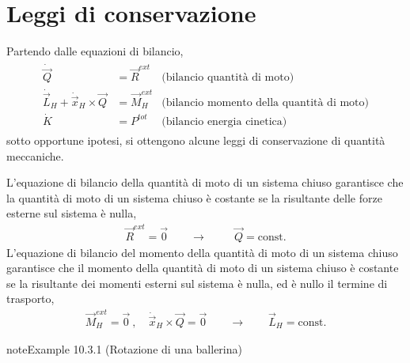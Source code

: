 \documentclass[letterpaper,10pt,italian]{jupyterBook}
\begin{document}
\section{Leggi di conservazione}
\label{\detokenize{ch/mechanics/dynamics-conservation:leggi-di-conservazione}}\label{\detokenize{ch/mechanics/dynamics-conservation:physics-hs-mechanics-dynamics-conservation}}\label{\detokenize{ch/mechanics/dynamics-conservation::doc}}
\sphinxAtStartPar
Partendo dalle equazioni di bilancio,
\begin{equation*}
\begin{split}\begin{aligned}
 \dot{\vec{Q}} & = \vec{R}^{ext} & \text{(bilancio quantità di moto)} \\
 \dot{\vec{L}}_H + \dot{\vec{x}}_H \times \vec{Q} & = \vec{M}_H^{ext} & \text{(bilancio momento della quantità di moto)} \\
 \dot{K} & = P^{tot} & \text{(bilancio energia cinetica)}
\end{aligned}\end{split}
\end{equation*}
\sphinxAtStartPar
sotto opportune ipotesi, si ottengono alcune leggi di conservazione di quantità meccaniche.

\sphinxAtStartPar
{}
L’equazione di bilancio della quantità di moto di un sistema chiuso garantisce che la quantità di moto di un sistema chiuso è costante se la risultante delle forze esterne sul sistema è nulla,
\begin{equation*}
\begin{split}
  \vec{R}^{ext} = \vec{0} \qquad  \rightarrow \qquad \ \ \vec{Q} = \text{const.} 
\end{split}
\end{equation*}
\sphinxAtStartPar
{}
L’equazione di bilancio del momento della quantità di moto di un sistema chiuso garantisce che il momento della quantità di moto di un sistema chiuso è costante se la risultante dei momenti esterni sul sistema è nulla, ed è nullo il termine di trasporto,
\begin{equation*}
\begin{split}
  \vec{M}_H^{ext} = \vec{0} \ , \quad \dot{\vec{x}}_H \times \vec{Q} = \vec{0} \qquad  \rightarrow \qquad \vec{L}_H = \text{const.}
\end{split}
\end{equation*}\label{ch/mechanics/dynamics-conservation:example-0}
\begin{sphinxadmonition}{note}{Example 10.3.1 (Rotazione di una ballerina)}


\end{sphinxadmonition}
\end{document}
